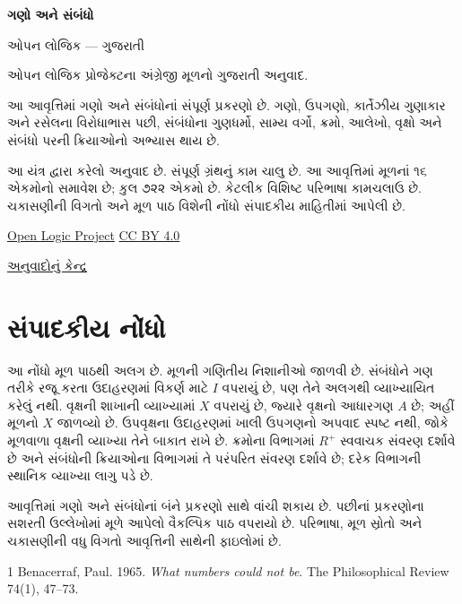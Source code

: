
\usepackage[authoryear]{natbib}
\renewcommand{\refname}{સંદર્ભગ્રંથો}
\renewcommand{\partname}{ભાગ}
\newenvironment{intro}{}{}
\newcommand{\Id}[1]{\mathord{\mathrm{Id}_{#1}}}
\newcommand{\equivrep}[2]{[#1]_{#2}}
\newcommand{\equivclass}[2]{#1/_{\!{#2}}}
\newcommand{\funrestrictionto}[2]{#1\mathord{\restriction}_{#2}}
\newcommand{\funimage}[2]{#1[#2]}
\newcommand{\emptyseq}{\Lambda}
\newcommand{\liff}{\mathbin{\leftrightarrow}}

\begin{titlepage}
{\Huge\bfseries ગણો અને સંબંધો\par}
\vspace{1em}
{\Large ઓપન લોજિક — ગુજરાતી\par}
\vspace{2em}
ઓપન લોજિક પ્રોજેક્ટના અંગ્રેજી મૂળનો ગુજરાતી અનુવાદ.\par
\vspace{1em}
આ આવૃત્તિમાં ગણો અને સંબંધોનાં સંપૂર્ણ પ્રકરણો છે.
ગણો, ઉપગણો, કાર્તેઝીય ગુણાકાર અને રસેલના વિરોધાભાસ પછી,
સંબંધોના ગુણધર્મો, સામ્ય વર્ગો, ક્રમો, આલેખો, વૃક્ષો અને
સંબંધો પરની ક્રિયાઓનો અભ્યાસ થાય છે.\par
\vfill
આ યંત્ર દ્વારા કરેલો અનુવાદ છે. સંપૂર્ણ ગ્રંથનું કામ ચાલુ છે.
આ આવૃત્તિમાં મૂળનાં ૧૬ એકમોનો સમાવેશ છે; કુલ ૭૨૨ એકમો છે.
કેટલીક વિશિષ્ટ પરિભાષા કામચલાઉ છે. ચકાસણીની વિગતો અને
મૂળ પાઠ વિશેની નોંધો સંપાદકીય માહિતીમાં આપેલી છે.\par
\vspace{1em}
\href{https://github.com/OpenLogicProject/OpenLogic}{Open Logic Project}
\quad \href{https://creativecommons.org/licenses/by/4.0/}{CC BY 4.0}\par
\href{https://github.com/KokunoYumeto/OpenLogic-translations}{અનુવાદોનું કેન્દ્ર}\par
\end{titlepage}
\tableofcontents
\clearpage

\clearpage
\section*{સંપાદકીય નોંધો}
આ નોંધો મૂળ પાઠથી અલગ છે. મૂળની ગણિતીય નિશાનીઓ જાળવી છે.
સંબંધોને ગણ તરીકે રજૂ કરતા ઉદાહરણમાં વિકર્ણ માટે \(I\) વપરાયું છે,
પણ તેને અલગથી વ્યાખ્યાયિત કરેલું નથી. વૃક્ષની શાખાની વ્યાખ્યામાં
\(X\) વપરાયું છે, જ્યારે વૃક્ષનો આધારગણ \(A\) છે; અહીં મૂળનો
\(X\) જાળવ્યો છે. ઉપવૃક્ષના ઉદાહરણમાં ખાલી ઉપગણનો અપવાદ
સ્પષ્ટ નથી, જોકે મૂળવાળા વૃક્ષની વ્યાખ્યા તેને બાકાત રાખે છે.
ક્રમોના વિભાગમાં \(R^+\) સ્વવાચક સંવરણ દર્શાવે છે અને
સંબંધોની ક્રિયાઓના વિભાગમાં તે પરંપરિત સંવરણ દર્શાવે છે;
દરેક વિભાગની સ્થાનિક વ્યાખ્યા લાગુ પડે છે.

આવૃત્તિમાં ગણો અને સંબંધોનાં બંને પ્રકરણો સાથે વાંચી શકાય છે.
પછીનાં પ્રકરણોના સશરતી ઉલ્લેખોમાં મૂળે આપેલો વૈકલ્પિક પાઠ
વપરાયો છે. પરિભાષા, મૂળ સ્રોતો અને ચકાસણીની વધુ વિગતો
આવૃત્તિની સાથેની ફાઇલોમાં છે.
\begin{thebibliography}{1}
Benacerraf, Paul. 1965.
\emph{What numbers could not be}.
The Philosophical Review 74(1), 47--73.
\end{thebibliography}

